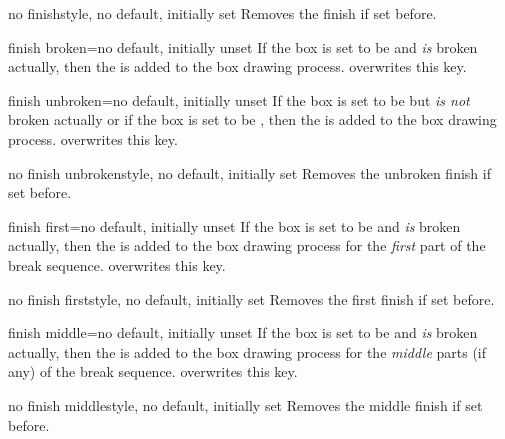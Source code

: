 \clearpage
\begin{docTcbKey}{no finish}{}{style, no default, initially set}
  Removes the finish if set before.
\end{docTcbKey}


\begin{docTcbKey}{finish broken}{=}{no default, initially unset}
  If the box is set to be  and \emph{is} broken actually,
  then the  is added to the box drawing process.
   overwrites this key.
\end{docTcbKey}

\begin{docTcbKey}{finish unbroken}{=}{no default, initially unset}
  If the box is set to be  but \emph{is not} broken actually
  or if the box is set to be ,
  then the  is added to the box drawing process.
   overwrites this key.
\end{docTcbKey}

\begin{docTcbKey}{no finish unbroken}{}{style, no default, initially set}
  Removes the unbroken finish if set before.
\end{docTcbKey}

\begin{docTcbKey}{finish first}{=}{no default, initially unset}
  If the box is set to be  and \emph{is} broken actually,
  then the  is added to the box drawing process for
  the \emph{first} part of the break sequence.
   overwrites this key.
\end{docTcbKey}

\begin{docTcbKey}{no finish first}{}{style, no default, initially set}
  Removes the first finish if set before.
\end{docTcbKey}

\begin{docTcbKey}{finish middle}{=}{no default, initially unset}
  If the box is set to be  and \emph{is} broken actually,
  then the  is added to the box drawing process for
  the \emph{middle} parts (if any) of the break sequence.
   overwrites this key.
\end{docTcbKey}

\begin{docTcbKey}{no finish middle}{}{style, no default, initially set}
  Removes the middle finish if set before.
\end{docTcbKey}

